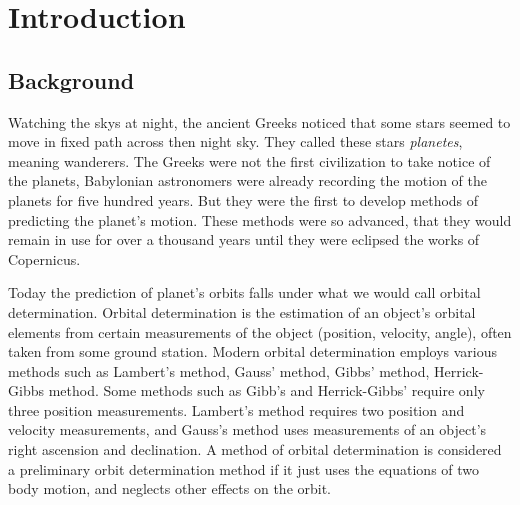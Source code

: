 \documentclass[12pt]{article}
\begin{document}
	\newpage

	\section{Introduction}
	\subsection{Background}
	Watching the skys at night, the ancient Greeks noticed that some stars seemed to move in fixed path across then night sky. They called these stars \textit{planetes}, meaning wanderers. The Greeks were not the first civilization to take notice of the planets, Babylonian astronomers were already recording the motion of the planets for five hundred years. But they were the first to develop methods of predicting the planet's motion. These methods were so advanced, that they would remain in use for over a thousand years until they were eclipsed the works of Copernicus\cite{lectureOnGreekAstro}. %
	
	Today the prediction of planet's orbits falls under what we would call orbital determination. Orbital determination is the estimation of an object's orbital elements from certain measurements of the object (position, velocity, angle), often taken from some ground station. Modern orbital determination employs various methods such as Lambert's method, Gauss' method, Gibbs' method, Herrick-Gibbs method. Some methods such as Gibb's and Herrick-Gibbs' require only three position measurements. Lambert's method requires two position and velocity measurements, and Gauss's method uses measurements of an object's right ascension and declination. A method of orbital determination is considered a preliminary orbit determination method if it just uses the equations of two body motion, and neglects other effects on the orbit.\par 
	
	
	
\end{document}
